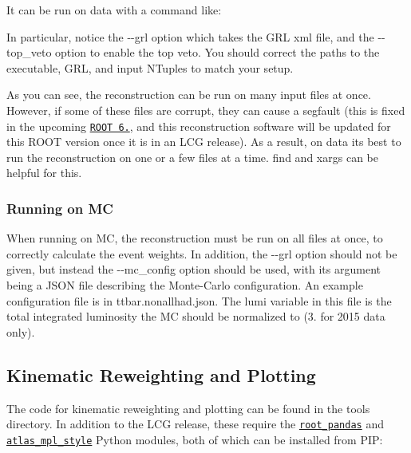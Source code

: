 It can be run on data with a command like\+:




In particular, notice the {\ttfamily -\/-\/grl} option which takes the G\+RL xml file, and the {\ttfamily -\/-\/top\+\_\+veto} option to enable the top veto. You should correct the paths to the executable, G\+RL, and input N\+Tuples to match your setup.

As you can see, the reconstruction can be run on many input files at once. However, if some of these files are corrupt, they can cause a segfault (this is fixed in the upcoming \href{https://root-forum.cern.ch/t/tdataframe-segfault-on-error-reading-file/29081}{\tt R\+O\+OT 6.}, and this reconstruction software will be updated for this R\+O\+OT version once it is in an L\+CG release). As a result, on data it\textquotesingle{}s best to run the reconstruction on one or a few files at a time. {\ttfamily find} and {\ttfamily xargs} can be helpful for this.

\subsubsection*{Running on MC}

When running on MC, the reconstruction must be run on all files at once, to correctly calculate the event weights. In addition, the {\ttfamily -\/-\/grl} option should not be given, but instead the {\ttfamily -\/-\/mc\+\_\+config} option should be used, with its argument being a J\+S\+ON file describing the Monte-\/\+Carlo configuration. An example configuration file is in {\ttfamily ttbar.\+nonallhad.\+json}. The {\ttfamily lumi} variable in this file is the total integrated luminosity the MC should be normalized to (3. for 2015 data only).

\subsection*{Kinematic Reweighting and Plotting}

The code for kinematic reweighting and plotting can be found in the {\ttfamily tools} directory. In addition to the L\+CG release, these require the \href{https://github.com/scikit-hep/root_pandas}{\tt root\+\_\+pandas} and \href{https://github.com/beojan/atlas-mpl}{\tt atlas\+\_\+mpl\+\_\+style} Python modules, both of which can be installed from P\+IP\+:


